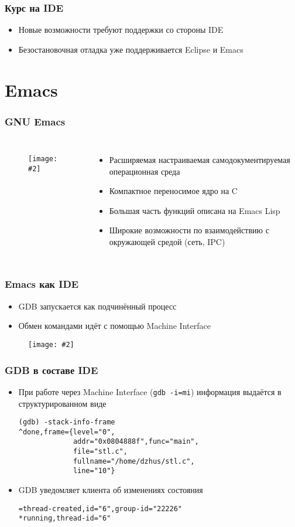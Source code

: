 \documentclass[onlymath]{beamer}
\newcommand\code\texttt
\newcommand{\cenfig}[2]{\begin{figure}\centering\texttt{[image: \#2]}
  \end{figure}}
\begin{document}
\begin{frame}
  \frametitle{Курс на IDE}
  \begin{itemize}
  \item Новые возможности требуют поддержки со стороны IDE
  \item Безостановочная отладка уже поддерживается Eclipse и Emacs
  \end{itemize}
\end{frame}

\section{Emacs}
\begin{frame}
  \frametitle{GNU Emacs}
  \begin{columns}
    \cenfig{0.2}{emacs.png}
  \begin{itemize}
  \item Расширяемая настраиваемая самодокументируемая операционная
    среда
  \item Компактное переносимое ядро на C
  \item Большая часть функций описана на Emacs Lisp
  \item Широкие возможности по взаимодействию с окружающей средой
    (сеть, IPC)
  \end{itemize}
\end{columns}
\end{frame}

\begin{frame}
  \frametitle{Emacs как IDE}
  \begin{itemize}
  \item GDB запускается как подчинённый процесс
  \item Обмен командами идёт с помощью Machine Interface
  \end{itemize}
  \cenfig{0.2}{emacs-gdb.png}
\end{frame}

\begin{frame}[fragile]
  \frametitle{GDB в составе IDE}
  \begin{itemize}
  \item При работе через Machine Interface (\code{gdb -i=mi})
    информация выдаётся в структурированном виде
\begin{lstlisting}[style=session]
(gdb) -stack-info-frame
^done,frame={level="0",
             addr="0x0804888f",func="main",
             file="stl.c",
             fullname="/home/dzhus/stl.c",
             line="10"}
\end{lstlisting}
  \item GDB уведомляет клиента об изменениях состояния
\begin{lstlisting}[style=session]
=thread-created,id="6",group-id="22226"
*running,thread-id="6"
\end{lstlisting}
  \end{itemize}
\end{frame}
\end{document}
